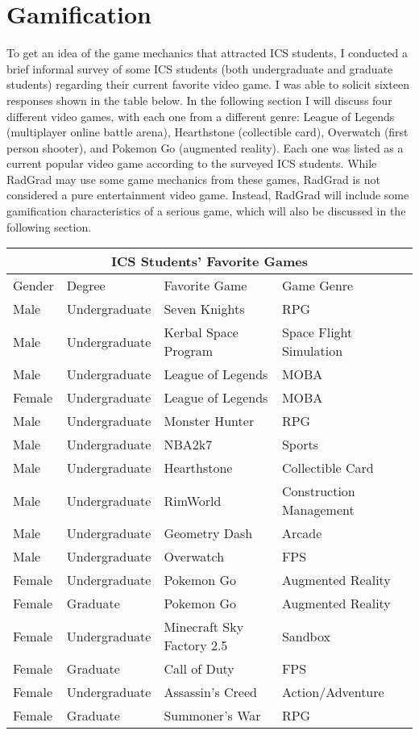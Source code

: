 \section{Gamification}

To get an idea of the game mechanics that attracted ICS students, I conducted a brief informal survey of some ICS students (both undergraduate and graduate students) regarding their current favorite video game. I was able to solicit sixteen responses shown in the table below. In the following section I will discuss four different video games, with each one from a different genre:  League of Legends (multiplayer online battle arena), Hearthstone (collectible card), Overwatch (first person shooter), and Pokemon Go (augmented reality). Each one was listed as a current popular video game according to the surveyed ICS students. While RadGrad may use some game mechanics from these games, RadGrad is not considered a pure entertainment video game. Instead, RadGrad will include some gamification characteristics of a serious game, which will also be discussed in the following section. 
\\
\begin{tabular}{ |p{2cm}|p{3cm}|p{5cm}|p{5cm}|}
 \hline
 \multicolumn{4}{|c|}{ICS Students' Favorite Games} \\
 \hline
 Gender & Degree & Favorite Game & Game Genre\\
 \hline
 Male   & Undergraduate    & Seven Knights & RPG\\
 Male   & Undergraduate    & Kerbal Space Program & Space Flight Simulation\\
 Male   & Undergraduate    & League of Legends & MOBA\\
 Female   & Undergraduate    & League of Legends & MOBA\\
 Male   & Undergraduate    & Monster Hunter & RPG\\
 Male   & Undergraduate    & NBA2k7 & Sports\\
 Male   & Undergraduate    & Hearthstone & Collectible Card\\
 Male   & Undergraduate    & RimWorld & Construction Management\\
 Male   & Undergraduate    & Geometry Dash & Arcade\\
 Male   & Undergraduate    & Overwatch & FPS\\
 Female   & Undergraduate    & Pokemon Go & Augmented Reality\\
 Female   & Graduate    & Pokemon Go & Augmented Reality\\
 Female   & Undergraduate    & Minecraft Sky Factory 2.5 & Sandbox\\
 Female   & Graduate    & Call of Duty & FPS\\
 Female   & Undergraduate    & Assassin's Creed & Action/Adventure\\
 Female   & Graduate    & Summoner's War & RPG\\
 \hline
\end{tabular}

